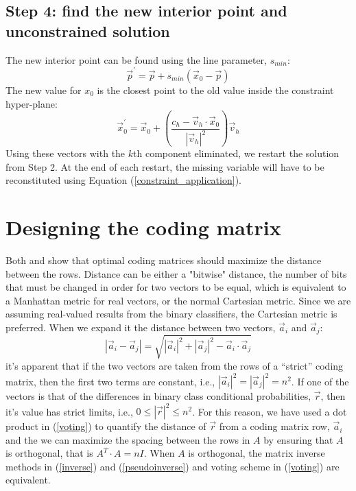 \documentclass{article}
\begin{document}
\subsection{Step 4: find the new interior point and unconstrained solution}

The new interior point can be found using the line parameter, $s_{min}$:
\begin{equation}
	\vec p^\prime = \vec p + s_{min} (\vec x_0 - \vec p)
\end{equation}
The new value for $x_0$ is the closest point to the old value inside the
constraint hyper-plane:
\begin{equation}
	\vec x_0^\prime = \vec x_0 + \left ( \frac{c_h - \vec v_h \cdot \vec x_0}{| \vec v_h |^2} \right ) \vec v_h
\end{equation}
Using these vectors with the $k$th component eliminated, we restart the
solution from Step 2.
At the end of each restart, the missing variable will have to be reconstituted
using Equation (\ref{constraint_application}).

\section{Designing the coding matrix}

Both \citet{Dietterich_Bakiri1995} and \citet{Allwein_etal2000} show that 
optimal coding matrices should maximize the distance between the rows.
Distance can be either a "bitwise" distance, the number of bits that must
be changed in order for two vectors to be equal, which is equivalent to a
Manhattan metric for real vectors, or the normal Cartesian metric.
Since we are assuming real-valued results from the binary classifiers, the
Cartesian metric is preferred. When we expand it the distance between
two vectors, $\vec a_i$ and $\vec a_j$:
\begin{equation}
	|\vec a_i - \vec a_j| = \sqrt{|\vec a_i|^2 + |\vec a_j|^2 - \vec a_i \cdot \vec a_j}
\end{equation}
it's apparent that if the two vectors are taken from the rows of a
``strict'' coding matrix,
then the first two terms are constant, i.e., $|\vec a_i|^2 = |\vec a_j|^2 = n^2$. If one of the vectors is that of the differences in binary class conditional
probabilities, $\vec r$, then it's value has strict limits, i.e.,
$0 \le |\vec r|^2 \le n^2$. For this reason, we have used a dot product 
in (\ref{voting}) to
quantify the distance of $\vec r$ from a coding matrix row, $\vec a_i$ and
the we can maximize the spacing between the rows in $A$ by ensuring that
$A$ is orthogonal, that is $A^T \cdot A = n I$. When $A$ is orthogonal,
the matrix inverse methods in (\ref{inverse}) and (\ref{pseudoinverse}) and voting scheme in (\ref{voting}) are equivalent.
\end{document}
